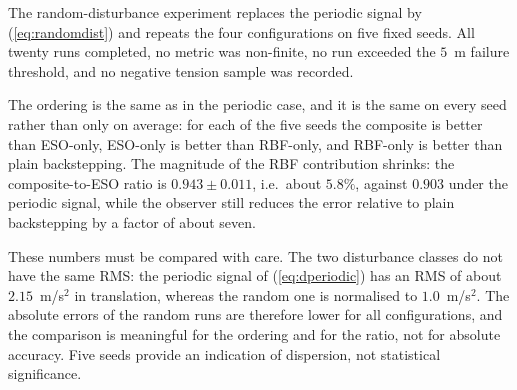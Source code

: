 \documentclass[Review,sageh,times]{sagej}
\begin{document}
The random-disturbance experiment replaces the periodic signal by
(\ref{eq:randomdist}) and repeats the four configurations on five fixed seeds.
All twenty runs completed, no metric was non-finite, no run exceeded the
$5$~m failure threshold, and no negative tension sample was recorded.

The ordering is the same as in the periodic case, and it is the same on every
seed rather than only on average: for each of the five seeds the composite is
better than ESO-only, ESO-only is better than RBF-only, and RBF-only is better
than plain backstepping. The magnitude of the RBF contribution shrinks: the
composite-to-ESO ratio is $0.943\pm0.011$, i.e.\ about $5.8\%$, against
$0.903$ under the periodic signal, while the observer still reduces the error
relative to plain backstepping by a factor of about seven.

These numbers must be compared with care. The two disturbance classes do not
have the same RMS: the periodic signal of (\ref{eq:dperiodic}) has an RMS of about
$2.15$~m/s$^2$ in translation, whereas the random one is normalised to
$1.0$~m/s$^2$. The absolute errors of the random runs are therefore lower for
all configurations, and the comparison is meaningful for the ordering and for
the ratio, not for absolute accuracy. Five seeds provide an indication of
dispersion, not statistical significance.

\begin{table}[t]
\centering
\caption{Non-periodic disturbance, five seeds: mean $\pm$ standard deviation
over the seeds, with the worst-case minimum tension and the total number of
failed runs.}
\label{tab:random}
\scriptsize
\setlength{\tabcolsep}{3pt}
\end{table}
\end{document}
